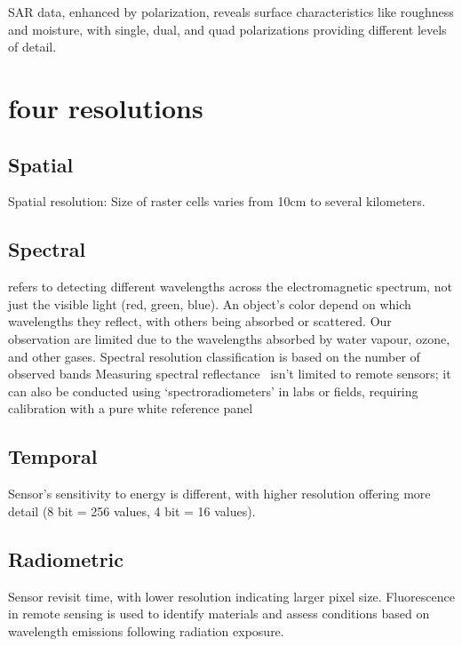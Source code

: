 \documentclass[
  letterpaper,
  DIV=11,
  numbers=noendperiod]{scrreprt}
\begin{document}
SAR data, enhanced by polarization, reveals surface characteristics like
roughness and moisture, with single, dual, and quad polarizations
providing different levels of detail.

\section{four resolutions}\label{four-resolutions}

\subsection{Spatial}\label{spatial}

Spatial resolution: Size of raster cells varies from 10cm to several
kilometers.

\subsection{Spectral}\label{spectral}

refers to detecting different wavelengths across the electromagnetic
spectrum, not just the visible light (red, green, blue). An object's
color depend on which wavelengths they reflect, with others being
absorbed or scattered. Our observation are limited due to the
wavelengths absorbed by water vapour, ozone, and other gases. Spectral
resolution classification is based on the number of observed bands
Measuring spectral reflectance~ isn't limited to remote sensors; it can
also be conducted using `spectroradiometers' in labs or fields,
requiring calibration with a pure white reference panel

\subsection{Temporal}\label{temporal}

Sensor's sensitivity to energy is different, with higher resolution
offering more detail (8 bit = 256 values, 4 bit = 16 values).

\subsection{Radiometric}\label{radiometric}

Sensor revisit time, with lower resolution indicating larger pixel size.
Fluorescence in remote sensing is used to identify materials and assess
conditions based on wavelength emissions following radiation exposure.
\end{document}
